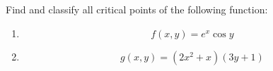 \documentclass[openany]{book}
\newcommand{\Z}{\mathbb{Z}}
\begin{document}
\begin{prob}
    Find and classify all critical points of the following function:
    \begin{enumerate}
        \item \begin{equation*}
            f(x,y)=e^x\cos y
        \end{equation*}
        \item \begin{equation*}
            g(x,y)=(2x^2+x)(3y+1)
        \end{equation*}
    \end{enumerate}
\end{prob}
\end{document}

